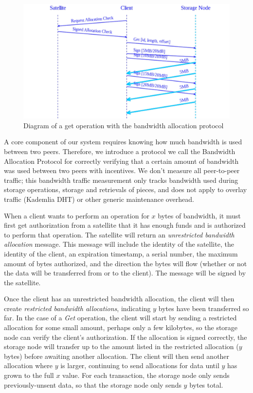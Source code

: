 \documentclass[11pt,fleqn,openany]{book}
\begin{document}
\begin{figure}
\centering
\includegraphics[width=\textwidth]{diagram-drafts/bandwidth-allocation/bandwidth-get.pdf}
\caption{Diagram of a get operation with the bandwidth allocation protocol}
\label{fig:bap-get}
\end{figure}

A core component of our system requires knowing how much bandwidth is used
between two peers. Therefore, we introduce a protocol we call the Bandwidth Allocation
Protocol for correctly verifying that a certain amount of bandwidth was used
between two peers with incentives.
We don't measure all peer-to-peer traffic;
this bandwidth traffic measurement only tracks
bandwidth used during storage operations, storage and retrievals of pieces,
and does not apply to overlay traffic (Kademlia DHT) or other generic
maintenance overhead.

When a client wants to perform an operation for $x$ bytes of bandwidth, it must
first get authorization from a satellite
that it has enough funds and is authorized to perform that operation.
The satellite will return an {\em unrestricted
bandwidth allocation} message. This message will include the identity of the
satellite, the identity of the client, an expiration timestamp, a serial number,
the maximum amount of bytes authorized, and the direction the bytes will flow
(whether or not the data will be transferred from or to the client).
The message will be signed by the satellite.


Once the client has an unrestricted bandwidth allocation, the client will then
create {\em restricted bandwidth allocations},
indicating $y$ bytes have been transferred so far. In the case of a {\em Get}
operation, the client
will start by sending a restricted allocation for some small amount,
perhaps only a few kilobytes,
so the storage node can verify the client's authorization.
If the allocation is signed correctly, the storage node will
transfer up to the amount listed in the restricted allocation ($y$ bytes) before
awaiting another allocation. The client will then send another allocation where
$y$ is larger, continuing to send allocations for data until $y$ has grown to
the full $x$ value.
For each transaction, the storage node only sends previously-unsent data,
so that the storage node only sends $y$ bytes total.
\end{document}
